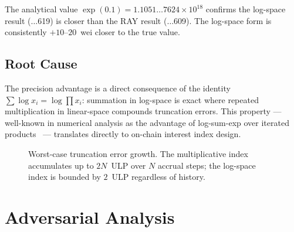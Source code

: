 \documentclass[10pt,a4paper,twocolumn]{article}
\begin{document}
The analytical value $\exp(0.1) = 1.1051{\ldots}7624 \times 10^{18}$ confirms the log-space result ($\ldots$619) is closer than the RAY result ($\ldots$609). The log-space form is consistently $+10$--$20$~wei closer to the true value.

\subsection{Root Cause}
\label{subsec:precision-root}

The precision advantage is a direct consequence of the identity $\sum \log x_i = \log \prod x_i$: summation in log-space is exact where repeated multiplication in linear-space compounds truncation errors. This property --- well-known in numerical analysis as the advantage of log-sum-exp over iterated products~\cite{higham2002} --- translates directly to on-chain interest index design.

\begin{figure}[htbp]
\centering
{}
\caption{Worst-case truncation error growth. The multiplicative index accumulates up to $2N$~ULP over $N$ accrual steps; the log-space index is bounded by $2$~ULP regardless of history.}
\label{fig:precision}
\end{figure}

\section{Adversarial Analysis}
\label{sec:adversarial}
\end{document}
